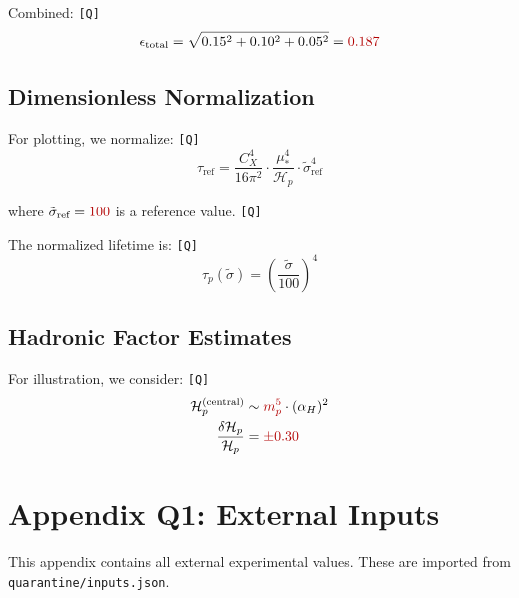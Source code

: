 \documentclass[11pt,a4paper]{article}
\newcommand{\Qval}[1]{\textcolor{red!70!black}{#1}}
\newcommand{\tagQ}{\textcolor{red!70!black}{\texttt{[Q]}}}
\theoremstyle{definition}
\begin{document}
Combined: \tagQ{}
\begin{equation}
\label{eq:template-total}
\epsilon_{\text{total}} = \sqrt{0.15^2 + 0.10^2 + 0.05^2} = \Qval{0.187}
\end{equation}

\subsection{Dimensionless Normalization}
\label{subsec:norm-choice}

For plotting, we normalize: \tagQ{}
\begin{equation}
\label{eq:norm-ref}
\tau_{\text{ref}} = \frac{C_X^4}{16\pi^2} \cdot \frac{\mu_*^4}{\mathcal{H}_p} \cdot \tilde{\sigma}_{\text{ref}}^4
\end{equation}

where $\tilde{\sigma}_{\text{ref}} = \Qval{100}$ is a reference value. \tagQ{}

The normalized lifetime is: \tagQ{}
\begin{equation}
\label{eq:norm-tau}
\hat{\tau}_p(\tilde{\sigma}) = \left(\frac{\tilde{\sigma}}{100}\right)^4
\end{equation}

\subsection{Hadronic Factor Estimates}
\label{subsec:hp-estimates}

For illustration, we consider: \tagQ{}
\begin{align}
\label{eq:hp-central}
\mathcal{H}_p^{\text{(central)}} &\sim \Qval{m_p^5} \cdot (\alpha_H)^2 \\
\label{eq:hp-range}
\frac{\delta\mathcal{H}_p}{\mathcal{H}_p} &= \Qval{\pm 0.30}
\end{align}

\newpage
\appendix
\section{Appendix Q1: External Inputs}
\label{app:q1}


\begin{quarantinebox}
This appendix contains all external experimental values.
These are imported from \texttt{quarantine/inputs.json}.
\end{quarantinebox}
\end{document}
